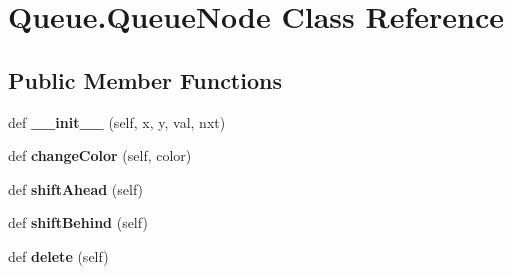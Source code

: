 \hypertarget{class_queue_1_1_queue_node}{}\section{Queue.\+Queue\+Node Class Reference}
\label{class_queue_1_1_queue_node}
\subsection*{Public Member Functions}
\begin{DoxyCompactItemize}
\item 
def {\bfseries \+\_\+\+\_\+init\+\_\+\+\_\+} (self, x, y, val, nxt)\hypertarget{class_queue_1_1_queue_node_acfe34780ae926af46ebe32a58c8e030c}{}\label{class_queue_1_1_queue_node_acfe34780ae926af46ebe32a58c8e030c}

\item 
def {\bfseries change\+Color} (self, color)\hypertarget{class_queue_1_1_queue_node_a97a3e71ba6dddf6a6d40d4222402238b}{}\label{class_queue_1_1_queue_node_a97a3e71ba6dddf6a6d40d4222402238b}

\item 
def {\bfseries shift\+Ahead} (self)\hypertarget{class_queue_1_1_queue_node_a71dbaccc8320cb100d14fcf8c8764c83}{}\label{class_queue_1_1_queue_node_a71dbaccc8320cb100d14fcf8c8764c83}

\item 
def {\bfseries shift\+Behind} (self)\hypertarget{class_queue_1_1_queue_node_ac4f2637c989e8d98c5bf20ce9481dce4}{}\label{class_queue_1_1_queue_node_ac4f2637c989e8d98c5bf20ce9481dce4}

\item 
def {\bfseries delete} (self)\hypertarget{class_queue_1_1_queue_node_af50c356dd13964a0378e13034eec53ca}{}\label{class_queue_1_1_queue_node_af50c356dd13964a0378e13034eec53ca}

\end{DoxyCompactItemize}
